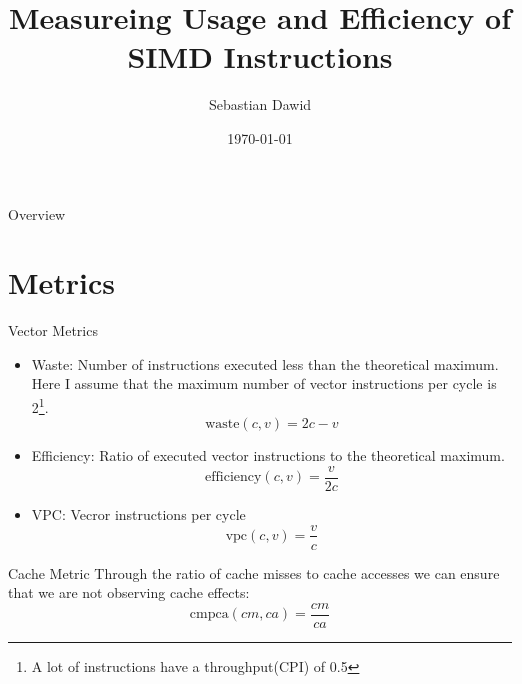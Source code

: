 \documentclass[aspectratio=169,xcolor=dvipsnames]{beamer}
\title[short title]{Measureing Usage and Efficiency of SIMD Instructions} %
\author[Sebastian] {Sebastian Dawid}
\date{\today} %
\begin{document}
\begin{frame}
    \titlepage
\end{frame}

\begin{frame}{Overview}
    \tableofcontents
\end{frame}

\section{Metrics}

\begin{frame}{Vector Metrics}
    \begin{itemize}
        \item Waste: Number of instructions executed less than the theoretical maximum. Here I assume that the maximum number of vector instructions per cycle is 2\footnote{A lot of instructions have a throughput(CPI) of 0.5}.
            \begin{equation*}
                \text{waste}(c, v) = 2c - v
            \end{equation*}
        \item Efficiency: Ratio of executed vector instructions to the theoretical maximum.
            \begin{equation*}
                \text{efficiency}(c, v) = \frac{v}{2c}
            \end{equation*}
        \item VPC: Vecror instructions per cycle
            \begin{equation*}
                \text{vpc}(c, v) = \frac{v}{c}
            \end{equation*}
    \end{itemize}
\end{frame}

\begin{frame}{Cache Metric}
    Through the ratio of cache misses to cache accesses we can ensure that we are not observing cache effects:
    \begin{equation*}
        \text{cmpca}(cm, ca) = \frac{cm}{ca}
    \end{equation*}
\end{frame}
\end{document}
